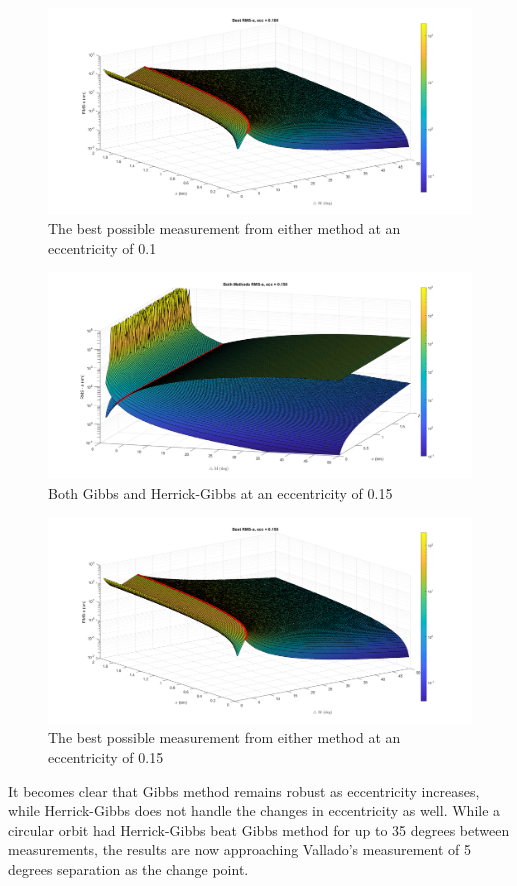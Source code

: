 \documentclass[12pt]{article}
\begin{document}
\begin{figure}
	\centering
	\includegraphics[width=0.7\linewidth]{bestMethods_e_1}
	\caption{The best possible measurement from either method at an eccentricity of 0.1}
	\label{fig:bestmethodse1}
\end{figure}
	\begin{figure}
	\centering
	\includegraphics[width=0.7\linewidth]{bothMethods_e_15}
	\caption{Both Gibbs and Herrick-Gibbs at an eccentricity of 0.15}
	\label{fig:bothmethodse15}
\end{figure}
\begin{figure}
	\centering
	\includegraphics[width=0.7\linewidth]{bestMethods_e_15}
	\caption{The best possible measurement from either method at an eccentricity of 0.15}
	\label{fig:bestmethodse15}
\end{figure}
\fi

It becomes clear that Gibbs method remains robust as eccentricity increases, while Herrick-Gibbs does not handle the changes in eccentricity as well. While a circular orbit had Herrick-Gibbs beat Gibbs method for up to 35 degrees between measurements, the results are now approaching Vallado's measurement of 5 degrees separation as the change point.\par 
\end{document}
